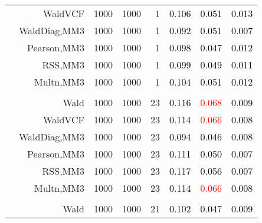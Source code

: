 \documentclass[
]{article}
\begin{document}
\begin{table}[H]
{\begin{tabular}[t]{lrrrrrrr}
\hspace{1em} & WaldVCF & 1000 & 1000 & 1 & \textcolor{black}{0.106} & \textcolor{black}{0.051} & \textcolor{black}{0.013}\\

\hspace{1em} & WaldDiag,MM3 & 1000 & 1000 & 1 & \textcolor{black}{0.092} & \textcolor{black}{0.051} & \textcolor{black}{0.007}\\

\hspace{1em} & Pearson,MM3 & 1000 & 1000 & 1 & \textcolor{black}{0.098} & \textcolor{black}{0.047} & \textcolor{black}{0.012}\\

\hspace{1em} & RSS,MM3 & 1000 & 1000 & 1 & \textcolor{black}{0.099} & \textcolor{black}{0.049} & \textcolor{black}{0.011}\\

\hspace{1em} & Multn,MM3 & 1000 & 1000 & 1 & \textcolor{black}{0.104} & \textcolor{black}{0.051} & \textcolor{black}{0.012}\\
\cmidrule{1-8}
\addlinespace[0.3em]
\multicolumn{8}{l}{\textbf{1F 15V}}\\
\hspace{1em} & Wald & 1000 & 1000 & 23 & \textcolor{black}{0.116} & \textcolor{red}{0.068} & \textcolor{black}{0.009}\\

\hspace{1em} & WaldVCF & 1000 & 1000 & 23 & \textcolor{black}{0.114} & \textcolor{red}{0.066} & \textcolor{black}{0.008}\\

\hspace{1em} & WaldDiag,MM3 & 1000 & 1000 & 23 & \textcolor{black}{0.094} & \textcolor{black}{0.046} & \textcolor{black}{0.008}\\

\hspace{1em} & Pearson,MM3 & 1000 & 1000 & 23 & \textcolor{black}{0.111} & \textcolor{black}{0.050} & \textcolor{black}{0.007}\\

\hspace{1em} & RSS,MM3 & 1000 & 1000 & 23 & \textcolor{black}{0.117} & \textcolor{black}{0.056} & \textcolor{black}{0.007}\\

\hspace{1em} & Multn,MM3 & 1000 & 1000 & 23 & \textcolor{black}{0.114} & \textcolor{red}{0.066} & \textcolor{black}{0.008}\\
\cmidrule{1-8}
\addlinespace[0.3em]
\multicolumn{8}{l}{\textbf{2F 10V}}\\
\hspace{1em} & Wald & 1000 & 1000 & 21 & \textcolor{black}{0.102} & \textcolor{black}{0.047} & \textcolor{black}{0.009}\\


\end{tabular}}
\end{table}
\end{document}
